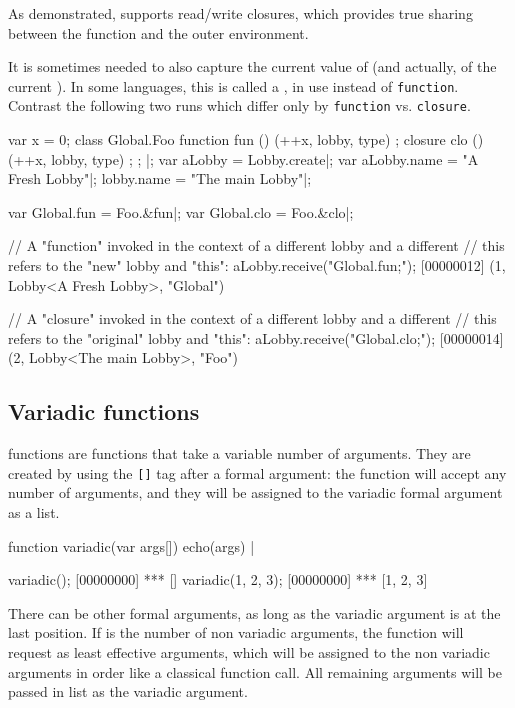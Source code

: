 As demonstrated, \us supports read/write closures, which provides true
sharing between the function and the outer environment.


It is sometimes needed to also capture the current value of \this (and
actually, of the current ).  In some languages, this is
called a , in \us use  instead of
\lstinline|function|.  Contrast the following two runs which differ only by
\lstinline|function| vs. \lstinline|closure|.

\begin{urbiscript}
{
  var x = 0;
  class Global.Foo
  {
    function fun () { (++x, lobby, type) };
    closure  clo () { (++x, lobby, type) };
  };
}|;
var aLobby = Lobby.create|;
var aLobby.name = "A Fresh Lobby"|;
lobby.name = "The main Lobby"|;

var Global.fun = Foo.&fun|;
var Global.clo = Foo.&clo|;

// A "function" invoked in the context of a different lobby and a different
// this refers to the "new" lobby and "this":
aLobby.receive("Global.fun;");
[00000012] (1, Lobby<A Fresh Lobby>, "Global")

// A "closure" invoked in the context of a different lobby and a different
// this refers to the "original" lobby and "this":
aLobby.receive("Global.clo;");
[00000014] (2, Lobby<The main Lobby>, "Foo")
\end{urbiscript}


\subsection{Variadic functions}
\label{sec:lang:fun-variadic}

 functions are functions that take a variable number of
arguments. They are created by using the \lstinline|[]| tag after a
formal argument: the function will accept any number of arguments, and
they will be assigned to the variadic formal argument as a list.

\begin{urbiscript}
function variadic(var args[])
{
  echo(args)
} |

variadic();
[00000000] *** []
variadic(1, 2, 3);
[00000000] *** [1, 2, 3]
\end{urbiscript}

There can be other formal arguments, as long as the variadic argument is at
the last position. If  is the number of non variadic arguments, the
function will request as least  effective arguments, which will be
assigned to the non variadic arguments in order like a classical function
call. All remaining arguments will be passed in list as the variadic
argument.

